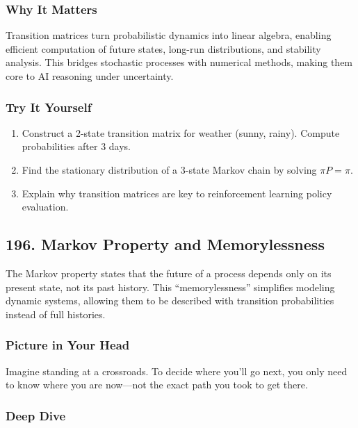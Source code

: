 \documentclass[
  letterpaper,
  DIV=11,
  numbers=noendperiod]{scrreprt}
\providecommand{\tightlist}{%
  \setlength{\itemsep}{0pt}\setlength{\parskip}{0pt}}
\begin{document}
\subsubsection{Why It Matters}\label{why-it-matters-92}

Transition matrices turn probabilistic dynamics into linear algebra,
enabling efficient computation of future states, long-run distributions,
and stability analysis. This bridges stochastic processes with numerical
methods, making them core to AI reasoning under uncertainty.

\subsubsection{Try It Yourself}\label{try-it-yourself-194}

\begin{enumerate}
\def\labelenumi{\arabic{enumi}.}
\tightlist
\item
  Construct a 2-state transition matrix for weather (sunny, rainy).
  Compute probabilities after 3 days.
\item
  Find the stationary distribution of a 3-state Markov chain by solving
  \(\pi P = \pi\).
\item
  Explain why transition matrices are key to reinforcement learning
  policy evaluation.
\end{enumerate}

\subsection{196. Markov Property and
Memorylessness}\label{markov-property-and-memorylessness}

The Markov property states that the future of a process depends only on
its present state, not its past history. This ``memorylessness''
simplifies modeling dynamic systems, allowing them to be described with
transition probabilities instead of full histories.

\subsubsection{Picture in Your Head}\label{picture-in-your-head-195}

Imagine standing at a crossroads. To decide where you'll go next, you
only need to know where you are now---not the exact path you took to get
there.

\subsubsection{Deep Dive}\label{deep-dive-195}
\end{document}
